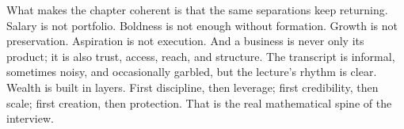 What makes the chapter coherent is that the same separations keep returning. Salary is not portfolio. Boldness is not enough without formation. Growth is not preservation. Aspiration is not execution. And a business is never only its product; it is also trust, access, reach, and structure. The transcript is informal, sometimes noisy, and occasionally garbled, but the lecture's rhythm is clear. Wealth is built in layers. First discipline, then leverage; first credibility, then scale; first creation, then protection. That is the real mathematical spine of the interview.